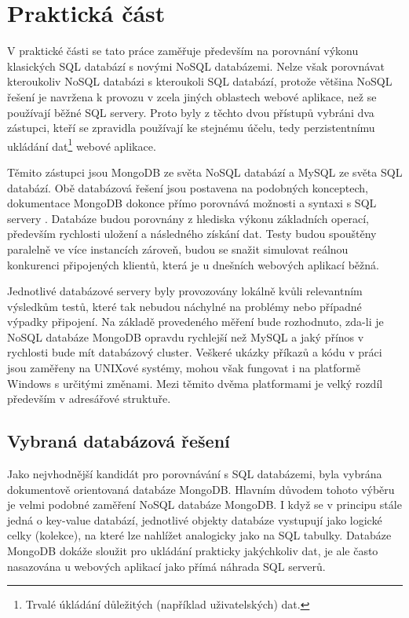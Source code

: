 \chapter{Praktická část}
V praktické části se tato práce zaměřuje především na porovnání výkonu klasických SQL databází s novými NoSQL databázemi. Nelze však porovnávat kteroukoliv NoSQL databázi s kteroukoli SQL databází, protože většina NoSQL řešení je navržena k provozu v zcela jiných oblastech webové aplikace, než se používají běžné SQL servery. Proto byly z těchto dvou přístupů vybráni dva zástupci, kteří se zpravidla používají ke stejnému účelu, tedy perzistentnímu ukládání dat\footnote{Trvalé úkládání důležitých (například uživatelských) dat.} webové aplikace.

Těmito zástupci jsou MongoDB ze světa NoSQL databází a MySQL ze světa SQL databází. Obě databázová řešení jsou postavena na podobných konceptech, dokumentace MongoDB dokonce přímo porovnává možnosti a syntaxi s SQL servery \cite{mongoMySQLMapChart}.
Databáze budou porovnány z hlediska výkonu základních operací, především rychlosti uložení a následného získání dat. Testy budou spouštěny paralelně ve více instancích zároveň, budou se snažit simulovat reálnou konkurenci připojených klientů, která je u dnešních webových aplikací běžná. 

Jednotlivé databázové servery byly provozovány lokálně kvůli relevantním výsledkům testů, které tak nebudou náchylné na problémy nebo případné výpadky připojení. Na základě provedeného měření bude rozhodnuto, zda-li je NoSQL databáze MongoDB opravdu rychlejší než MySQL a jaký přínos v rychlosti bude mít databázový cluster. Veškeré ukázky příkazů a kódu v práci jsou zaměřeny na UNIXové systémy, mohou však fungovat i na platformě Windows s určitými změnami. Mezi těmito dvěma platformami je velký rozdíl především v adresářové struktuře.
\section{Vybraná databázová řešení}
Jako nejvhodnější kandidát pro porovnávání s SQL databázemi, byla vybrána dokumentově orientovaná databáze MongoDB. Hlavním důvodem tohoto výběru je velmi podobné zaměření NoSQL databáze MongoDB. I když se v principu stále jedná o key-value databází, jednotlivé objekty databáze vystupují jako logické celky (kolekce), na které lze nahlížet analogicky jako na SQL tabulky. Databáze MongoDB dokáže sloužit pro ukládání prakticky jakýchkoliv dat, je ale často nasazována u webových aplikací jako přímá náhrada SQL serverů.


